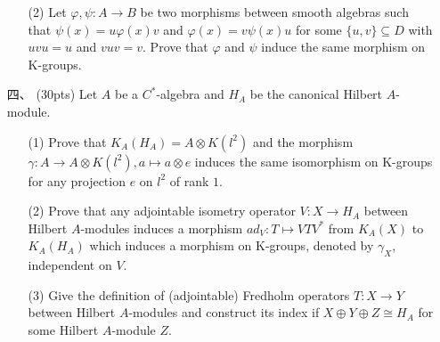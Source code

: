 \begin{itemize}
\begin{itemize}
        \item[(2)]Let $\varphi,\psi:A\to B$ be two morphisms between smooth algebras such that $\psi(x)=u\varphi(x)v$ and $\varphi(x)=v\psi(x)u$ for some $\{u,v\}\subseteq D$ with $uvu=u$ and $vuv=v$. Prove that $\varphi$ and $\psi$ induce the same morphism on K-groups.
    \end{itemize}
    \item[四、](30pts) Let $A$ be a $C^*$-algebra and $H_A$ be the canonical Hilbert $A$-module.
    \begin{itemize}
        \item[(1)]Prove that $K_A(H_A)=A\otimes K(l^2)$ and the morphism $\gamma:A\to A\otimes K(l^2),a\mapsto a\otimes e$ induces the same isomorphism on K-groups for any projection $e$ on $l^2$ of rank $1$.
        \item[(2)]Prove that any adjointable isometry operator $V:X\to H_A$ between Hilbert $A$-modules induces a morphism $ad_V:T\mapsto VTV^*$ from $K_A(X)$ to $K_A(H_A)$ which induces a morphism on K-groups, denoted by $\gamma_X$, independent on $V$.
        \item[(3)]Give the definition of (adjointable) Fredholm operators $T:X\to Y$ between Hilbert $A$-modules and construct its index if $X\oplus Y\oplus Z\cong H_A$ for some Hilbert $A$-module $Z$.
    \end{itemize}
\end{itemize}
